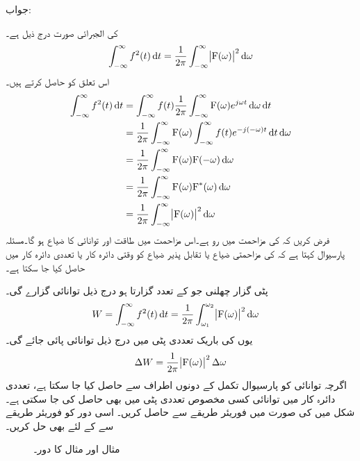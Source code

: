 جواب:

 کی الجبرائی صورت درج ذیل ہے۔
\begin{align}
\int_{-\infty}^{\infty} f^2(t) \dif t=\frac{1}{2\pi}\int_{-\infty}^{\infty} \abs{\bF(\omega)}^2\dif \omega
\end{align}
اس تعلق کو حاصل کرتے ہیں۔
\begin{align*}
\int_{-\infty}^{\infty} f^2(t) \dif t&=\int_{-\infty}^{\infty} f(t) \frac{1}{2\pi} \int_{-\infty}^{\infty} \bF(\omega) e^{j\omega t} \dif \omega \dif t\\
&= \frac{1}{2\pi} \int_{-\infty}^{\infty}\bF(\omega)\int_{-\infty}^{\infty}  f(t) e^{-j(-\omega) t} \dif t \dif \omega \\
&= \frac{1}{2\pi} \int_{-\infty}^{\infty}\bF(\omega)\bF(-\omega) \dif \omega \\
&=\frac{1}{2\pi}  \int_{-\infty}^{\infty} \bF(\omega)\bF^*(\omega) \dif \omega \\
&=\frac{1}{2\pi}  \int_{-\infty}^{\infty} \abs{\bF(\omega)}^2\dif \omega 
\end{align*}
فرض کریں کہ  کی مزاحمت میں رو  ہے۔اس مزاحمت میں طاقت  اور توانائی کا ضیاع  ہو گا۔مسئلہ پارسیوال کہتا ہے کہ  کی مزاحمتی ضیاع یا تقابل پذیر ضیاع کو وقتی دائرہ کار یا تعددی دائرہ کار میں حاصل کیا جا سکتا ہے۔ 

پٹی گزار چھلنی جو  کے تعدد گزارتا ہو درج ذیل توانائی گزارے گی۔
\begin{align}
W=\int_{-\infty}^{\infty} f^2(t) \dif t&=\frac{1}{2\pi}  \int_{\omega_1}^{\omega_2} \abs{\bF(\omega)}^2\dif \omega 
\end{align}
یوں  کی باریک تعددی پٹی میں درج ذیل توانائی پائی جائے گی۔
\begin{align}
\Delta W=\frac{1}{2\pi} \abs{{{\textup{F}}}(\omega)}^2 \Delta \omega
\end{align}
اگرچہ توانائی کو پارسیوال تکمل کے دونوں اطراف سے حاصل کیا جا سکتا ہے، تعددی دائرہ کار میں توانائی کسی مخصوص تعددی پٹی میں بھی حاصل کی جا سکتی ہے۔
شکل  میں  کی صورت میں  فوریئر طریقے سے حاصل کریں۔ اسی دور کو فوریئر طریقے سے  کے لئے بھی حل کریں۔ 
\begin{figure}
\centering
{}
\caption{مثال  اور مثال  کا دور۔}
\label{شکل_فوریئر_مزاحمت_امالہ}
\end{figure}

